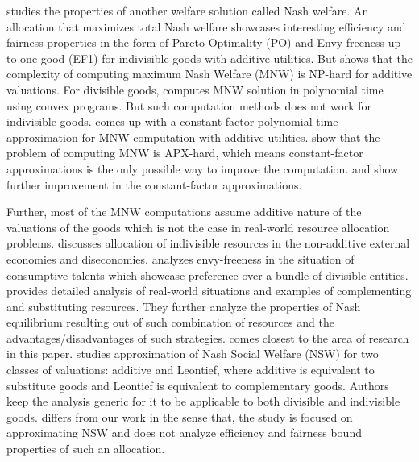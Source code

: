 \citet{caragiannis2016unreasonable} studies the properties of another welfare solution called Nash welfare. An allocation that maximizes total Nash welfare showcases interesting efficiency and fairness properties in the form of Pareto Optimality (PO) and Envy-freeness up to one good (EF1) for indivisible goods with additive utilities. But \citet{ramezani2009nash} shows that the complexity of computing maximum Nash Welfare (MNW) is NP-hard for additive valuations. For divisible goods, \citet{eisenberg1959consensus} computes MNW solution in polynomial time using convex programs. But such computation methods does not work for indivisible goods. \citet{cole2015approximating} comes up with a constant-factor polynomial-time approximation for MNW computation with additive utilities. \citet{lee2017apx} show that the problem of computing MNW is APX-hard, which means constant-factor approximations is the only possible way to improve the computation. \citet{cole2017convex} and \citet{barman2018finding} show further improvement in the constant-factor approximations.

Further, most of the MNW computations assume additive nature of the valuations of the goods which is not the case in real-world resource allocation problems. \citet{reiter1962allocating} discusses allocation of indivisible resources in the non-additive external economies and diseconomies. \citet{arnsperger1994envy} analyzes envy-freeness in the situation of consumptive talents which showcase preference over a bundle of divisible entities. \citet{alvisi2009complementing} provides detailed analysis of real-world situations and examples of complementing and substituting resources. They further analyze the properties of Nash equilibrium resulting out of such combination of resources and the advantages/disadvantages of such strategies. \citet{branzei2017nash} comes closest to the area of research in this paper. \citet{branzei2017nash} studies approximation of Nash Social Welfare (NSW) for two classes of valuations: additive and Leontief, where additive is equivalent to substitute goods and Leontief is equivalent to complementary goods. Authors keep the analysis generic for it to be applicable to both divisible and indivisible goods. \citet{branzei2017nash} differs from our work in the sense that, the study is focused on approximating NSW and does not analyze efficiency and fairness bound properties of such an allocation.


